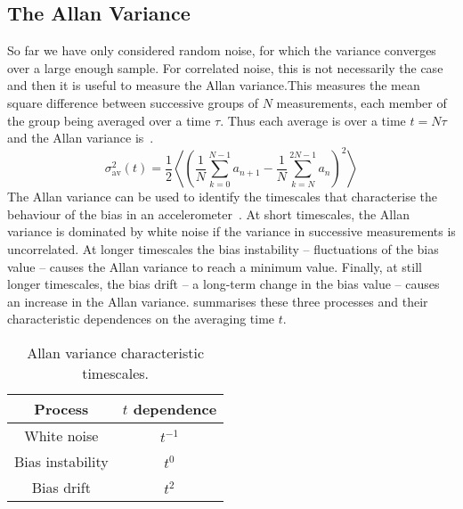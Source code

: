 \subsection{The Allan Variance}\label{subsec:allan_variance}
So far we have only considered random noise, for which the variance
converges over a large enough sample. For correlated noise, this is
not necessarily the case and then it is useful to measure the Allan
variance.This measures the mean square difference between successive groups of
$N$ measurements, each member of the group being averaged over a time
$\tau$. Thus each average is over a time $t = N \tau$ and the Allan
variance is~\cite{Allan1966}. 
\begin{equation}
  \sigma_\text{av}^2(t) = \frac{1}{2}
  \left\langle
  \left(\frac{1}{N}\sum_{k=0}^{N-1}a_{n+1}-\frac{1}{N}\sum_{k=N}^{2N-1}a_n\right)^2\right\rangle
  \label{eq:allan_var_mean}
\end{equation}
The Allan variance can be used to identify the timescales that
characterise the behaviour of the bias in an
accelerometer~\cite{El-Sheimy2008}. At short
timescales, the Allan variance is dominated by white noise if the
variance in successive measurements is uncorrelated. 
At longer timescales the bias instability -- fluctuations of
the bias value -- causes the Allan variance to reach a minimum value.
Finally, at still longer timescales, the bias drift -- a long-term
change in the bias value -- causes
an increase in the Allan variance.  summarises
these three processes and their characteristic dependences on the
averaging time $t$.
\begin{table}[htpb]
  \centering
  \begin{tabular}{cc}
  \toprule
    Process & $t$ dependence \\ 
    \midrule
    White noise & $t^{-1}$ \\
    Bias instability & $t^{0}$ \\
    Bias drift & $t^{2}$\\
    \bottomrule
  \end{tabular}
  \caption{Allan variance characteristic timescales.}
  \label{tab:avar}
\end{table}


